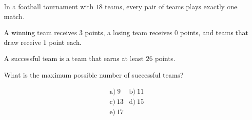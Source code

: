 In a football tournament with \(18\) teams, every pair of teams plays exactly one match.



A winning team receives \(3\) points, a losing team receives \(0\) points, and teams that draw receive \(1\) point each.



A successful team is a team that earns at least \(26\) points.



What is the maximum possible number of successful teams?



\[
\begin{array}{ll}
\text{a)}\ 9 & \text{b)}\ 11 \\
\text{c)}\ 13 & \text{d)}\ 15 \\
\text{e)}\ 17
\end{array}
\]
